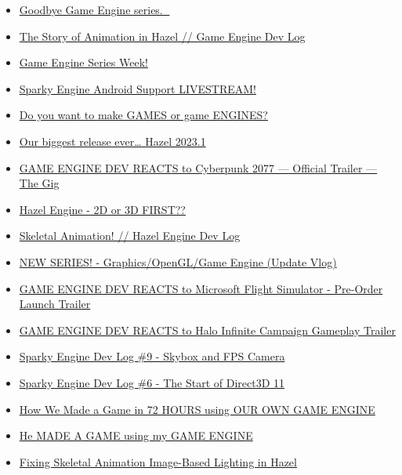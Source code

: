 \begin{itemize}
\tightlist
\item
  \href{https://www.youtube.com/watch?v=4w9NYltdaew}{Goodbye Game Engine series. 👋}
\item
  \href{https://www.youtube.com/watch?v=HPZo1oFESYQ}{The Story of Animation in Hazel // Game Engine Dev Log}
\item
  \href{https://www.youtube.com/watch?v=Q4wHOx5av0w}{Game Engine Series Week!}
\item
  \href{https://www.youtube.com/watch?v=skBXS9cFknc}{Sparky Engine Android Support LIVESTREAM!}
\item
  \href{https://www.youtube.com/watch?v=Y4J4ZdQGEgo}{Do you want to make GAMES or game ENGINES?}
\item
  \href{https://www.youtube.com/watch?v=L_XLGmG2Ct8}{Our biggest release ever\ldots{} Hazel 2023.1}
\item
  \href{https://www.youtube.com/watch?v=ZyfFCIFHYuk}{GAME ENGINE DEV REACTS to Cyberpunk 2077 --- Official Trailer --- The Gig}
\item
  \href{https://www.youtube.com/watch?v=bS9CiTFNvWc}{Hazel Engine - 2D or 3D FIRST??}
\item
  \href{https://www.youtube.com/watch?v=8-wAi--vW1o}{Skeletal Animation! // Hazel Engine Dev Log}
\item
  \href{https://www.youtube.com/watch?v=U2JrxdeezHU}{NEW SERIES! - Graphics/OpenGL/Game Engine (Update Vlog)}
\item
  \href{https://www.youtube.com/watch?v=OVGqZP9BJ6s}{GAME ENGINE DEV REACTS to Microsoft Flight Simulator - Pre-Order Launch Trailer}
\item
  \href{https://www.youtube.com/watch?v=HWtEcbiuLBQ}{GAME ENGINE DEV REACTS to Halo Infinite \textbar{} Campaign Gameplay Trailer}
\item
  \href{https://www.youtube.com/watch?v=H2Z6SmPTFSU}{Sparky Engine Dev Log \#9 - Skybox and FPS Camera}
\item
  \href{https://www.youtube.com/watch?v=AsNE-eGmGxs}{Sparky Engine Dev Log \#6 - The Start of Direct3D 11}
\item
  \href{https://www.youtube.com/watch?v=tQ_pjZDfm-0}{How We Made a Game in 72 HOURS using OUR OWN GAME ENGINE}
\item
  \href{https://www.youtube.com/watch?v=56ISmbJE9S4}{He MADE A GAME using my GAME ENGINE}
\item
  \href{https://www.youtube.com/watch?v=fs9ChRr4VHM}{Fixing Skeletal Animation Image-Based Lighting in Hazel}

\end{itemize}
